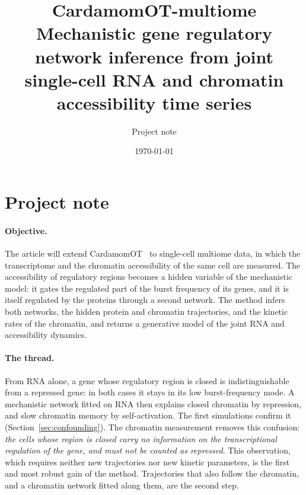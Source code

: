 \documentclass[a4paper, 11pt]{article}
\title{CardamomOT-multiome\\[0.3em] \large Mechanistic gene regulatory network inference from joint\\ single-cell RNA and chromatin accessibility time series}
\author{Project note}
\date{\today}
\theoremstyle{plain}
\theoremstyle{remark}
\begin{document}
\maketitle

\section*{Project note}

\paragraph{Objective.} The article will extend CardamomOT~\cite{mauge2026cardamomot} to single-cell multiome data, in which the transcriptome and the chromatin accessibility of the same cell are measured. The accessibility of regulatory regions becomes a hidden variable of the mechanistic model: it gates the regulated part of the burst frequency of its genes, and it is itself regulated by the proteins through a second network. The method infers both networks, the hidden protein and chromatin trajectories, and the kinetic rates of the chromatin, and returns a generative model of the joint RNA and accessibility dynamics.

\paragraph{The thread.} From RNA alone, a gene whose regulatory region is closed is indistinguishable from a repressed gene: in both cases it stays in its low burst-frequency mode. A mechanistic network fitted on RNA then explains closed chromatin by repression, and slow chromatin memory by self-activation. The first simulations confirm it (Section~\ref{sec:confounding}). The chromatin measurement removes this confusion: \emph{the cells whose region is closed carry no information on the transcriptional regulation of the gene, and must not be counted as repressed}. This observation, which requires neither new trajectories nor new kinetic parameters, is the first and most robust gain of the method. Trajectories that also follow the chromatin, and a chromatin network fitted along them, are the second step.
\end{document}
